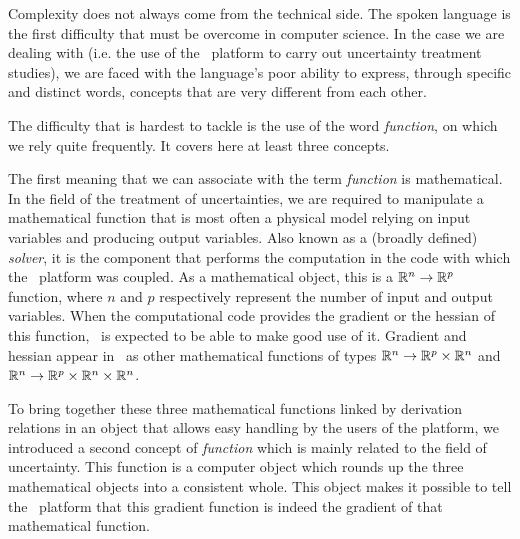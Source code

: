 
Complexity does not always come from the technical side. The spoken language is the first difficulty that must be overcome in computer science. In the case we are dealing with (i.e. the use of the \OT\ platform to carry out uncertainty treatment studies), we are faced with the language's poor ability to express, through specific and distinct words, concepts that are very different from each other.

The difficulty that is hardest to tackle is the use of the word \emph{function}, on which we rely quite frequently. It covers here at least three concepts.

The first meaning that we can associate with the term \emph{function} is mathematical. In the field of the treatment of uncertainties, we are required to manipulate a mathematical function that is most often a physical model relying on input variables and producing output variables. Also known as a (broadly defined) \emph{solver}, it is the component that performs the computation in the code with which the \OT\ platform was coupled. As a mathematical object, this is a ${\mathbb R}^{n} \to {\mathbb R}^{p}$ function, where $n$ and $p$ respectively represent the number of input and output variables. When the computational code provides the gradient or the hessian of this function, \OT\ is expected to be able to make good use of it. Gradient and hessian appear in \OT\ as other mathematical functions of types ${\mathbb R}^{n} \to {\mathbb R}^{p} \times {\mathbb R}^{n}$ and ${\mathbb R}^{n} \to {\mathbb R}^{p} \times {\mathbb R}^{n} \times {\mathbb R}^{n}$.

To bring together these three mathematical functions linked by derivation relations in an object that allows easy handling by the users of the platform, we introduced a second concept of \emph{function} which is mainly related to the field of uncertainty. This function is a computer object which rounds up the three mathematical objects into a consistent whole. This object makes it possible to tell the \OT\ platform that this gradient function is indeed the gradient of that mathematical function.

